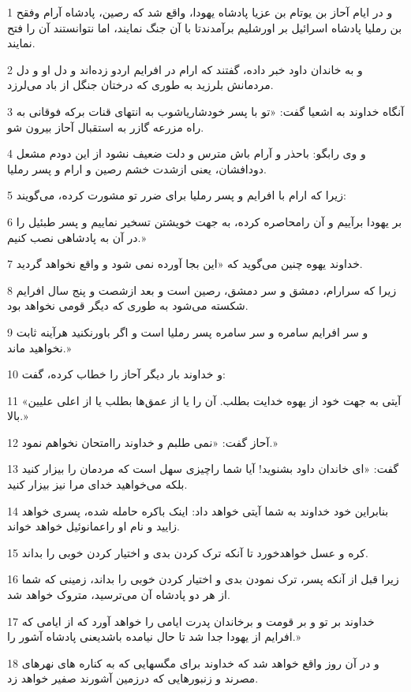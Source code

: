 \par 1 و در ایام آحاز بن یوتام بن عزیا پادشاه یهودا، واقع شد که رصین، پادشاه آرام وفقح بن رملیا پادشاه اسرائیل بر اورشلیم برآمدندتا با آن جنگ نمایند، اما نتوانستند آن را فتح نمایند.
\par 2 و به خاندان داود خبر داده، گفتند که ارام در افرایم اردو زده‌اند و دل او و دل مردمانش بلرزید به طوری که درختان جنگل از باد می‌لرزد.
\par 3 آنگاه خداوند به اشعیا گفت: «تو با پسر خودشاریاشوب به انتهای قنات برکه فوقانی به راه مزرعه گازر به استقبال آحاز بیرون شو.
\par 4 و وی رابگو: باحذر و آرام باش مترس و دلت ضعیف نشود از این دو‌دم مشعل دودافشان، یعنی ازشدت خشم رصین و ارام و پسر رملیا.
\par 5 زیرا که ارام با افرایم و پسر رملیا برای ضرر تو مشورت کرده، می‌گویند:
\par 6 بر یهودا برآییم و آن رامحاصره کرده، به جهت خویشتن تسخیر نماییم و پسر طبئیل را در آن به پادشاهی نصب کنیم.»
\par 7 خداوند یهوه چنین می‌گوید که «این بجا آورده نمی شود و واقع نخواهد گردید.
\par 8 زیرا که سرارام، دمشق و سر دمشق، رصین است و بعد ازشصت و پنج سال افرایم شکسته می‌شود به طوری که دیگر قومی نخواهد بود.
\par 9 و سر افرایم سامره و سر سامره پسر رملیا است و اگر باورنکنید هرآینه ثابت نخواهید ماند.»
\par 10 و خداوند بار دیگر آحاز را خطاب کرده، گفت:
\par 11 «آیتی به جهت خود از یهوه خدایت بطلب. آن را یا از عمق‌ها بطلب یا از اعلی علیین بالا.»
\par 12 آحاز گفت: «نمی طلبم و خداوند راامتحان نخواهم نمود.»
\par 13 گفت: «ای خاندان داود بشنوید! آیا شما راچیزی سهل است که مردمان را بیزار کنید بلکه می‌خواهید خدای مرا نیز بیزار کنید.
\par 14 بنابراین خود خداوند به شما آیتی خواهد داد: اینک باکره حامله شده، پسری خواهد زایید و نام او راعمانوئیل خواهد خواند.
\par 15 کره و عسل خواهدخورد تا آنکه ترک کردن بدی و اختیار کردن خوبی را بداند.
\par 16 زیرا قبل از آنکه پسر، ترک نمودن بدی و اختیار کردن خوبی را بداند، زمینی که شما از هر دو پادشاه آن می‌ترسید، متروک خواهد شد.
\par 17 خداوند بر تو و بر قومت و برخاندان پدرت ایامی را خواهد آورد که از ایامی که افرایم از یهودا جدا شد تا حال نیامده باشدیعنی پادشاه آشور را.»
\par 18 و در آن روز واقع خواهد شد که خداوند برای مگسهایی که به کناره های نهرهای مصرند و زنبورهایی که درزمین آشورند صفیر خواهد زد.
